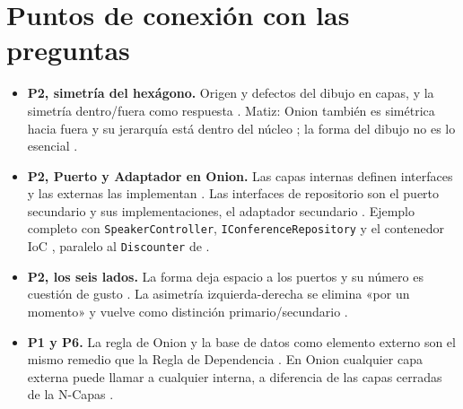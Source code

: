 \section{Puntos de conexión con las preguntas}

\begin{sloppypar}
\begin{itemize}
  \item \textbf{P2, simetría del hexágono.} Origen y defectos del dibujo en capas, y la simetría dentro/fuera como respuesta \citep[«Nature of the Solution»]{cockburn2005}. Matiz: Onion también es simétrica hacia fuera y su jerarquía está dentro del núcleo \citep{palermo2008}; la forma del dibujo no es lo esencial \citep{palermo2008c}.
  \item \textbf{P2, Puerto y Adaptador en Onion.} Las capas internas definen interfaces y las externas las implementan \citep{palermo2008c}. Las interfaces de repositorio son el puerto secundario y sus implementaciones, el adaptador secundario \citep{palermo2008}. Ejemplo completo con \texttt{SpeakerController}, \texttt{IConferenceRepository} y el contenedor IoC \citep{palermo2008b}, paralelo al \texttt{Discounter} de \citet[«Sample Code»]{cockburn2005}.
  \item \textbf{P2, los seis lados.} La forma deja espacio a los puertos \citep[«Nature of the Solution»]{cockburn2005} y su número es cuestión de gusto \citep[«How Many Ports?»]{cockburn2005}. La asimetría izquierda-derecha se elimina «por un momento» y vuelve como distinción primario/secundario \citep[«The Left-Right Asymmetry»]{cockburn2005}.
  \item \textbf{P1 y P6.} La regla de Onion y la base de datos como elemento externo son el mismo remedio que la Regla de Dependencia \citep{palermo2008}. En Onion cualquier capa externa puede llamar a cualquier interna, a diferencia de las capas cerradas de la N-Capas \citep{palermo2008c}.
\end{itemize}
\end{sloppypar}


